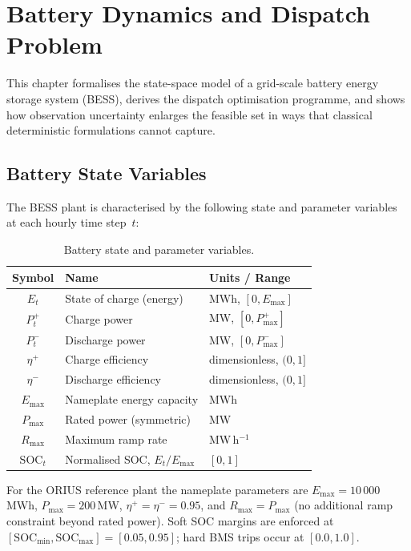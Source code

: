 
\chapter{Battery Dynamics and Dispatch Problem}
\label{ch:battery-dynamics}

This chapter formalises the state-space model of a grid-scale battery energy
storage system (BESS), derives the dispatch optimisation programme, and
shows how observation uncertainty enlarges the feasible set in ways that
classical deterministic formulations cannot capture.

\section{Battery State Variables}

The BESS plant is characterised by the following state and parameter
variables at each hourly time step~$t$:

\begin{table}[ht]
\centering
\caption{Battery state and parameter variables.}
\label{tab:battery-vars}
\begin{tabular}{cll}
\toprule
\textbf{Symbol} & \textbf{Name} & \textbf{Units / Range} \\
\midrule
$E_t$          & State of charge (energy)      & MWh, $[0, E_{\max}]$ \\
$P_t^{+}$     & Charge power                  & MW,  $[0, P_{\max}^{+}]$ \\
$P_t^{-}$     & Discharge power               & MW,  $[0, P_{\max}^{-}]$ \\
$\eta^{+}$    & Charge efficiency              & dimensionless, $(0,1]$ \\
$\eta^{-}$    & Discharge efficiency           & dimensionless, $(0,1]$ \\
$E_{\max}$    & Nameplate energy capacity      & MWh \\
$P_{\max}$    & Rated power (symmetric)        & MW \\
$R_{\max}$    & Maximum ramp rate              & MW\,h$^{-1}$ \\
$\mathrm{SOC}_t$ & Normalised SOC, $E_t / E_{\max}$ & $[0, 1]$ \\
\bottomrule
\end{tabular}
\end{table}

For the ORIUS reference plant the nameplate parameters are
$E_{\max} = 10\,000$\,MWh, $P_{\max} = 200$\,MW, $\eta^{+} = \eta^{-} = 0.95$,
and $R_{\max} = P_{\max}$ (no additional ramp constraint beyond rated power).
Soft SOC margins are enforced at $[\mathrm{SOC}_{\min}, \mathrm{SOC}_{\max}]
= [0.05, 0.95]$; hard BMS trips occur at $[0.0, 1.0]$.

